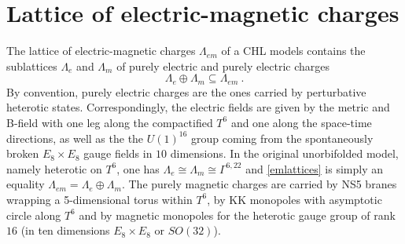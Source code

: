 \documentclass[a4paper,11pt]{article}
\newcommand{\ZZ}{\mathbb{Z}}
\numberwithin{equation}{section}
\def\be{\begin{equation}}
\def\ee{\end{equation}}
\begin{document}



\section{Lattice of electric-magnetic charges}\label{s:emlattices}

The lattice of electric-magnetic charges $\Lambda_{em}$ of a CHL models contains the sublattices $\Lambda_e$ and $\Lambda_m$  of purely electric and purely electric charges
\be\label{emlattices} \Lambda_e\oplus \Lambda_m\subseteq \Lambda_{em}\ .
\ee By convention, purely electric charges are the ones carried by perturbative heterotic states. Correspondingly, the electric fields are given by the metric and B-field with one leg along the compactified $T^6$ and one along the space-time directions, as well as the the $U(1)^{16}$ group coming from the spontaneously broken $E_8\times E_8$ gauge fields in $10$ dimensions. In the original unorbifolded model, namely heterotic on $T^6$, one has $\Lambda_e\cong \Lambda_m\cong \Gamma^{6,22}$ and \eqref{emlattices} is simply an equality $\Lambda_{em}=\Lambda_e\oplus \Lambda_m$. The purely magnetic charges are carried by NS5 branes wrapping a 5-dimensional torus within $T^6$, by KK monopoles with asymptotic circle along $T^6$ and by magnetic monopoles for the heterotic gauge group of rank $16$ (in ten dimensions $E_8\times E_8$ or $SO(32)$).

\medskip
\end{document}
